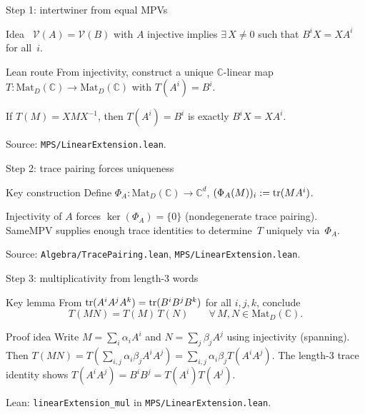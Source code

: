 \documentclass[aspectratio=169,10pt]{beamer}
\newcommand{\Mat}{\mathrm{Mat}}
\begin{document}
\begin{frame}{Step 1: intertwiner from equal MPVs}
    \vspace{-0.6em}

    \begin{block}{Idea~\cite{Perez-Garcia2007Matrix,Cirac2021Matrix}}
        $\mathcal{V}(A)=\mathcal{V}(B)$ with $A$ injective implies
        $\exists\, X\neq 0$ such that $B^i X = X A^i$ for all~$i$.
    \end{block}

    \begin{block}{Lean route}
        From injectivity, construct a unique $\mathbb{C}$-linear map
        $T : \Mat_D(\mathbb{C})\to \Mat_D(\mathbb{C})$ with $T(A^i)=B^i$.

        \textcolor{dimwhite}{\footnotesize If $T(M)=XMX^{-1}$, then $T(A^i)=B^i$ is exactly $B^i X = X A^i$.}
    \end{block}

    \textcolor{dimwhite}{\footnotesize Source: \texttt{MPS/LinearExtension.lean}.}
\end{frame}

\begin{frame}{Step 2: trace pairing forces uniqueness}
    \vspace{-0.6em}

    \begin{block}{Key construction}
        Define
        $\Phi_A : \Mat_D(\mathbb{C}) \to \mathbb{C}^d$, \quad $(\Phi_A(M))_i := \mathrm{tr}(M A^i)$.

        Injectivity of $A$ forces $\ker(\Phi_A)=\{0\}$ (nondegenerate trace pairing).
        SameMPV supplies enough trace identities to determine~$T$ uniquely via~$\Phi_A$.
    \end{block}

    \textcolor{dimwhite}{\footnotesize Source: \texttt{Algebra/TracePairing.lean}, \texttt{MPS/LinearExtension.lean}.}
\end{frame}

\begin{frame}{Step 3: multiplicativity from length-3 words}
    \vspace{-0.6em}

    \begin{block}{Key lemma}
        From $\mathrm{tr}(A^i A^j A^k)=\mathrm{tr}(B^i B^j B^k)$ for all $i,j,k$, conclude
        \[
            T(MN)=T(M)\,T(N)\qquad \forall\, M,N\in \Mat_D(\mathbb{C}).
        \]
    \end{block}

    \begin{block}{Proof idea}
        Write $M = \sum_i \alpha_i A^i$ and $N = \sum_j \beta_j A^j$ using injectivity (spanning).
        Then $T(MN) = T\!(\sum_{i,j} \alpha_i \beta_j A^i A^j) = \sum_{i,j} \alpha_i \beta_j T(A^i A^j)$.
        The length-3 trace identity shows $T(A^i A^j) = B^i B^j = T(A^i)T(A^j)$.
    \end{block}

    \textcolor{dimwhite}{\footnotesize Lean: \texttt{linearExtension\_mul} in \texttt{MPS/LinearExtension.lean}.}
\end{frame}
\end{document}
